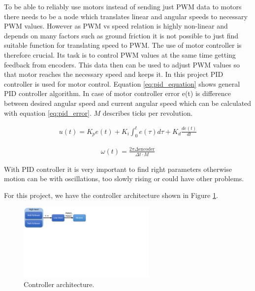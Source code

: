 To be able to reliably use motors instead of sending just PWM data to motors there needs to be a node which translates linear and angular speeds to necessary PWM values. However as PWM vs speed relation is highly non-linear and depends on many factors such as ground friction it is not possible to just find suitable function for translating speed to PWM. The use of motor controller is therefore crucial. Its task is to control PWM values at the same time getting feedback from encoders. This data then can be used to adjust PWM values so that motor reaches the necessary speed and keeps it. In this project PID controller is used for motor control. Equation \ref{eq:pid_equation} shows general PID controller algorithm. In case of motor controller error e(t) is difference between desired angular speed and current angular speed which can be calculated with equation \ref{eq:pid_error}. $M$ describes ticks per revolution.

\begin{align}
\label{eq:pid_equation}
u(t) = K_p e(t) + K_i \int_{0}^{t} e(\tau) d\tau + K_d \frac{de(t)}{dt} 
\end{align}

\begin{align}
\label{eq:pid_error}
\omega (t) = \frac{2 \pi \Delta \text{encoder}}{\Delta t \cdot M}
\end{align}

With PID controller it is very important to find right parameters otherwise motion can be with oscillations, too slowly rising or could have other problems. 

For this project, we have the controller architecture shown in Figure \ref{fig:controller}.

\begin{figure}[h]    
\centering    
                \includegraphics[trim = 0mm 130mm 170mm 0mm, clip, width=0.6\textwidth]{figures/controller.pdf}
                \caption{Controller architecture.}
                \label{fig:controller}
\end{figure}

